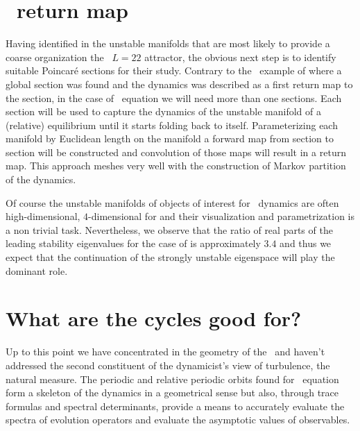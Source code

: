 

\section{\KS\ return map}

Having identified in  the unstable manifolds that are most likely to provide
a coarse organization the \KS\ $L=22$ attractor, the obvious next step is to identify
suitable Poincar\'e sections for their study. Contrary to the \CLe\ example of 
where a global section was found and the dynamics was described as a first return map to the section,
in the case of \KS\ equation we will need more than one sections. Each section will be used to
capture the dynamics of the unstable manifold of a (relative) equilibrium until it starts folding back
to itself. Parameterizing each manifold by Euclidean length on the manifold a forward map from section to section will be constructed and convolution of those maps will result in a return map. This approach
meshes very well with the construction of Markov partition of the dynamics.

Of course the unstable manifolds of objects of interest for \KS\ dynamics are often high-dimensional,
\eg $4$-dimensional for  and their visualization and parametrization is a non trivial task.
Nevertheless, we observe that the ratio of real parts of the leading stability eigenvalues for the case of  is approximately $3.4$ and thus we expect that the continuation of the strongly unstable eigenspace will play the dominant role.

\section{What are the cycles good for?}

Up to this point we have concentrated in the geometry of the
\statesp\ and haven't addressed the second constituent of the
dynamicist's view of turbulence, the natural measure. The
periodic and relative periodic orbits found for \KS\ equation
form a skeleton of the dynamics in a geometrical sense but
also, through trace formulas and spectral
determinants, provide a means to accurately
evaluate the spectra of evolution operators and evaluate the
asymptotic values of observables.

